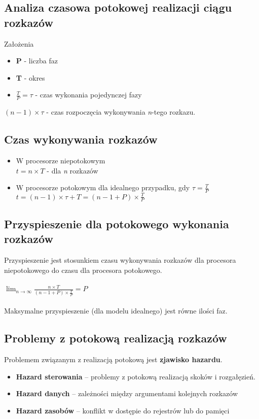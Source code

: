     	\subsection*{Analiza czasowa potokowej realizacji ciągu rozkazów}
    	Założenia
    	\begin{itemize}
    		\item \textbf{P} - liczba faz
    		\item \textbf{T} - okres
    		\item $\frac{T}{P}=\tau $ - czas wykonania pojedynczej fazy
    	\end{itemize}
    	$(n-1)\times\tau$ - czas rozpoczęcia wykonywania \emph{n}-tego rozkazu.
    	\subsection*{Czas wykonywania rozkazów}
    	\begin{itemize}
    		\item W procesorze niepotokowym\\
    		$t=n\times T$ - dla \emph{n} rozkazów
    		\item W procesorze potokowym dla idealnego przypadku, gdy $\tau=\frac{T}{P}$\\
    		$t=(n-1)\times\tau+T=(n-1+P)\times\frac{T}{P}$
    	\end{itemize}
    	\subsection*{Przyspieszenie dla potokowego wykonania rozkazów}
    	Przyspieszenie jest stosunkiem czasu wykonywania rozkazów dla procesora niepotokowego do czasu dla procesora potokowego.\\\\
    	$\lim_{n \to \infty}\frac{n\times T}{(n-1+P)\times\frac{T}{P}}=P$\\\\
    	Maksymalne przyspieszenie (dla modelu idealnego) jest równe ilości faz.
    	\subsection*{Problemy z potokową realizacją rozkazów}
    	Problemem związanym z realizacją potokową jest \textbf{zjawisko hazardu}.
    	\begin{itemize}
    		\item \textbf{Hazard sterowania }– problemy z potokową realizacją skoków i rozgałęzień.
    		\item \textbf{Hazard danych} – zależności między argumentami kolejnych rozkazów
    		\item \textbf{Hazard zasobów} – konflikt w dostępie do rejestrów lub do pamięci
    	\end{itemize}
